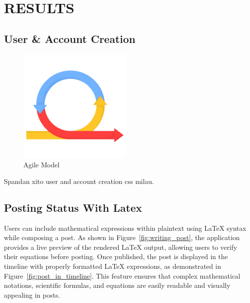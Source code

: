 \chapter{RESULTS}

\section{User \& Account Creation}

\begin{figure}[h!]
    \centering
    \includegraphics[width=0.5\textwidth]{Graphics/agile.png}
    \caption{Agile Model}
\end{figure}

Spandan xito user and account creation css milau.



\section{Posting Status With Latex}

Users can include mathematical expressions within plaintext using LaTeX syntax while composing a post. As shown in Figure~\ref{fig:writing_post}, the application provides a live preview of the rendered LaTeX output, allowing users to verify their equations before posting. Once published, the post is displayed in the timeline with properly formatted LaTeX expressions, as demonstrated in Figure~\ref{fig:post_in_timeline}. This feature ensures that complex mathematical notations, scientific formulas, and equations are easily readable and visually appealing in posts.

